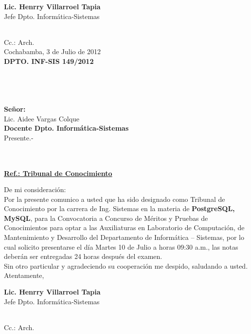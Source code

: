 \documentclass[letterpaper,11pt]{letter}
\begin{document}
\vspace{3.5cm}
\begin{center}
\begin{minipage}[b]{0.5\textwidth}
\begin{center}
{\bf Lic. Henrry Villarroel Tapia}\\
Jefe Dpto. Informática-Sistemas\\
\end{center}
\end{minipage}
\end{center}
~\\
Cc.: Arch.\\
\newpage
Cochabamba, 3 de Julio de 2012~\\
 \textbf{DPTO. INF-SIS 149/2012}\\
~\\
~\\
~\\
~\\
 \textbf{Señor:}~\\
Lic. Aidee Vargas Colque~\\
 \textbf{Docente Dpto. Informática-Sistemas}~\\
Presente.-\\
~\\
~\\
\begin{center}
\underline{ \textbf{Ref.: Tribunal de Conocimiento}}
\end{center}
De mi consideración:\\
Por la presente comunico a usted que ha sido designado como Tribunal de Conocimiento por la carrera de Ing. Sistemas en la materia de \textbf{PostgreSQL, MySQL}, para la Convocatoria a Concurso de Méritos y Pruebas de Conocimientos para optar a las Auxiliaturas en Laboratorio de Computación, de Mantenimiento y Desarrollo del Departamento de Informática – Sistemas, por lo cual solicito presentarse el día Martes 10 de Julio a horas 09:30 a.m., las notas deberán ser entregadas 24 horas después del examen.\\
Sin otro particular y agradeciendo su cooperación me despido, saludando a usted.\\
Atentamente,\\

\vspace{3.5cm}
\begin{center}
\begin{minipage}[b]{0.5\textwidth}
\begin{center}
{\bf Lic. Henrry Villarroel Tapia}\\
Jefe Dpto. Informática-Sistemas\\
\end{center}
\end{minipage}
\end{center}
~\\
Cc.: Arch.\\
\newpage
\end{document}
